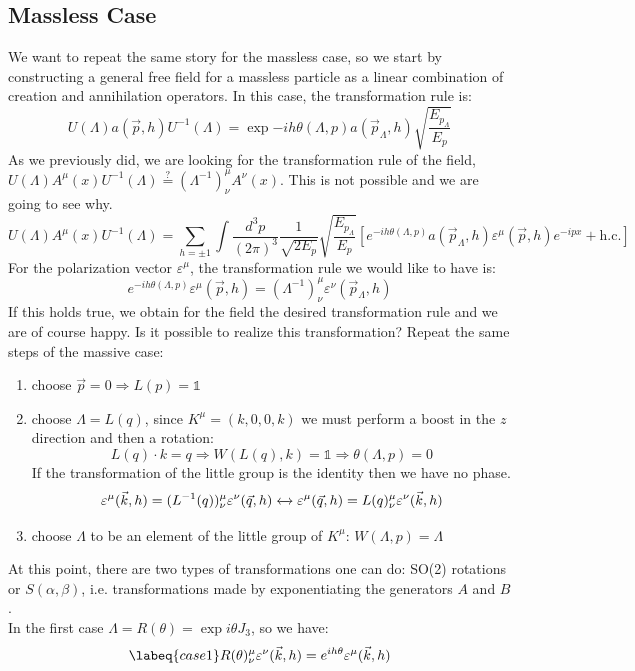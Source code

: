 \documentclass[../main.tex]{subfiles}
\begin{document}
\subsection{Massless Case}
We want to repeat the same story for the massless case, so we start by constructing a general free field for a massless particle as a linear combination of creation and annihilation operators. In this case, the transformation rule is:
\[
U(\Lambda)a(\vec{p},h)U^{-1}(\Lambda)=\exp{-ih\theta(\Lambda,p)}a(\vec{p}_\Lambda,h)\sqrt{\frac{E_{p_\Lambda}}{E_p}}
\]
As we previously did, we are looking for the transformation rule of the field, $U(\Lambda)A^\mu(x)U^{-1}(\Lambda)\stackrel{?}{=}(\Lambda^{-1})^\mu_\nu A^\nu(x)$. This is not possible and we are going to see why.
\[
U(\Lambda)A^\mu(x)U^{-1}(\Lambda)=\sum_{h=\pm1}\int\frac{d^3p}{(2\pi)^3}\frac{1}{\sqrt{2E_p}}\sqrt{\frac{E_{p_\Lambda}}{E_p}}\left[e^{-ih\theta(\Lambda,p)}a(\vec{p}_\Lambda,h)\varepsilon^\mu(\vec{p},h)e^{-ipx}+\text{h.c.}\right]
\]
For the polarization vector $\varepsilon^\mu$, the transformation rule we would like to have is:
\[
e^{-ih\theta(\Lambda,p)}\varepsilon^\mu(\vec{p},h)=(\Lambda^{-1})^\mu_\nu\varepsilon^\nu(\vec{p}_\Lambda,h)
\]
If this holds true, we obtain for the field the desired transformation rule and we are of course happy. Is it possible to realize this transformation? Repeat the same steps of the massive case:
\begin{enumerate}
    \item choose $\Vec{p}=0\Rightarrow L(p)=\mathbb{1}$
    \item choose $\Lambda=L(q)$, since $K^\mu=(k,0,0,k)$ we must perform a boost in the $z$ direction and then a rotation:
    \[
    L(q)\cdot k=q\Rightarrow W(L(q),k)=\mathbb{1}\Rightarrow\theta(\Lambda,p)=0
    \]
    If the transformation of the little group is the identity then we have no phase.
    \[
    \varepsilon^\mu(\vec{k},h)=(L^{-1}(q))^\mu_\nu\varepsilon^\nu(\vec{q},h)\xleftrightarrow[]{}\varepsilon^\mu(\vec{q},h)=L(q)^\mu_\nu\varepsilon^\nu(\vec{k},h)
    \]
    \item choose $\Lambda$ to be an element of the little group of $K^\mu$: $W(\Lambda,p)=\Lambda$
\end{enumerate}
At this point, there are two types of transformations one can do: SO(2) rotations or $S(\alpha,\beta)$, i.e. transformations made by exponentiating the generators $A$ and $B$.\\
In the first case $\Lambda=R(\theta)=\exp{i\theta J_3}$, so we have:
\begin{equation}
\labeq{case1}
R(\theta)^\mu_\nu\varepsilon^\nu(\vec{k},h)=e^{ih\theta}\varepsilon^\mu(\vec{k},h)
\end{equation}
\end{document}
